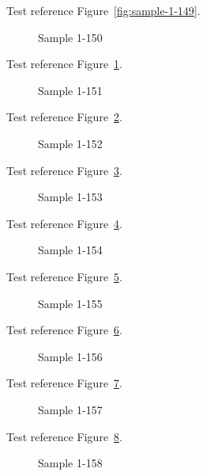 Test reference Figure~\ref{fig:sample-1-149}.

\begin{figure}[tbhp]
\caption{Sample 1-150}
\label{fig:sample-1-150}
\end{figure}

Test reference Figure~\ref{fig:sample-1-150}.

\begin{figure}[tbhp]
\caption{Sample 1-151}
\label{fig:sample-1-151}
\end{figure}

Test reference Figure~\ref{fig:sample-1-151}.

\begin{figure}[tbhp]
\caption{Sample 1-152}
\label{fig:sample-1-152}
\end{figure}

Test reference Figure~\ref{fig:sample-1-152}.

\begin{figure}[tbhp]
\caption{Sample 1-153}
\label{fig:sample-1-153}
\end{figure}

Test reference Figure~\ref{fig:sample-1-153}.

\begin{figure}[tbhp]
\caption{Sample 1-154}
\label{fig:sample-1-154}
\end{figure}

Test reference Figure~\ref{fig:sample-1-154}.

\begin{figure}[tbhp]
\caption{Sample 1-155}
\label{fig:sample-1-155}
\end{figure}

Test reference Figure~\ref{fig:sample-1-155}.

\begin{figure}[tbhp]
\caption{Sample 1-156}
\label{fig:sample-1-156}
\end{figure}

Test reference Figure~\ref{fig:sample-1-156}.

\begin{figure}[tbhp]
\caption{Sample 1-157}
\label{fig:sample-1-157}
\end{figure}

Test reference Figure~\ref{fig:sample-1-157}.

\begin{figure}[tbhp]
\caption{Sample 1-158}
\label{fig:sample-1-158}
\end{figure}

